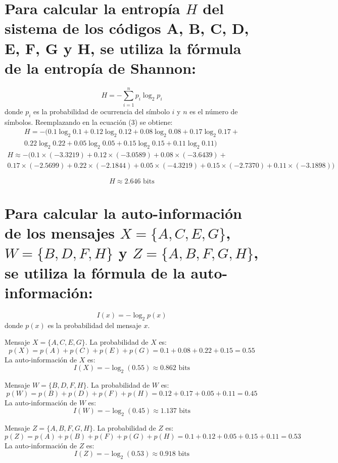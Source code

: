 \documentclass[
  11pt,
  letterpaper,
  answers
]{exam}
\begin{document}
\begin{questions}
\begin{solution}
\begin{parts}
\part{Para calcular la entropía \( H \) del sistema de los códigos A, B, C, D, E, F, G y H, se utiliza la fórmula de la entropía de Shannon:}
\begin{equation}
    H = - \sum_{i=1}^{n} p_i \log_2 p_i
\end{equation}    
donde $p_{i}$ es la probabilidad de ocurrencia del símbolo \( i \) y \( n \) es el número de símbolos. Reemplazando en la ecuación (3) se obtiene:
\begin{multline}
H = - (0.1 \log_2 0.1 + 0.12 \log_2 0.12 + 0.08 \log_2 0.08 + 0.17 \log_2 0.17 + \\
0.22 \log_2 0.22 + 0.05 \log_2 0.05 + 0.15 \log_2 0.15 + 0.11 \log_2 0.11)
\end{multline}
\begin{multline}
H \approx - (0.1 \times (-3.3219) + 0.12 \times (-3.0589) + 0.08 \times (-3.6439) + \\
0.17 \times (-2.5699) + 0.22 \times (-2.1844) + 0.05 \times (-4.3219) + 0.15 \times (-2.7370) + 0.11 \times (-3.1898))
\end{multline}

\begin{equation}
    H \approx 2.646 \text{ bits}
\end{equation}

\part{Para calcular la auto-información de los mensajes \( X = \{A, C, E, G\} \), \( W = \{B, D, F, H\} \) y \( Z = \{A, B, F, G, H\} \), se utiliza la fórmula de la auto-información:}

\[
I(x) = -\log_2 p(x)
\]
donde \( p(x) \) es la probabilidad del mensaje \( x \).

Mensaje \( X = \{A, C, E, G\} \). La probabilidad de \( X \) es:
\[
p(X) = p(A) + p(C) + p(E) + p(G) = 0.1 + 0.08 + 0.22 + 0.15 = 0.55
\]
La auto-información de \( X \) es:
\[
I(X) = -\log_2(0.55) \approx 0.862 \text{ bits}
\]

Mensaje \( W = \{B, D, F, H\} \). La probabilidad de \( W \) es:
\[
p(W) = p(B) + p(D) + p(F) + p(H) = 0.12 + 0.17 + 0.05 + 0.11 = 0.45
\]
La auto-información de \( W \) es:
\[
I(W) = -\log_2(0.45) \approx 1.137 \text{ bits}
\]

Mensaje \( Z = \{A, B, F, G, H\} \). La probabilidad de \( Z \) es:
\[
p(Z) = p(A) + p(B) + p(F) + p(G) + p(H) = 0.1 + 0.12 + 0.05 + 0.15 + 0.11 = 0.53
\]
La auto-información de \( Z \) es:
\[
I(Z) = -\log_2(0.53) \approx 0.918 \text{ bits}
\]


\end{parts}
\end{solution}
\end{questions}
\end{document}
